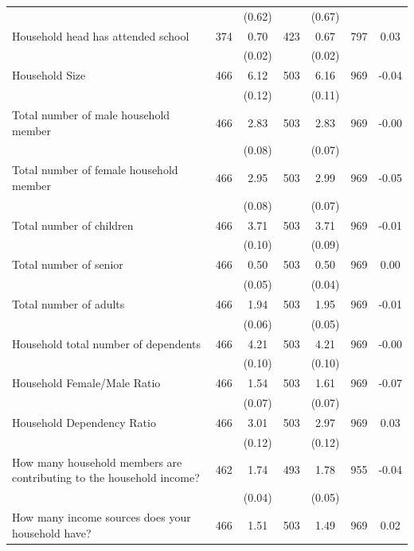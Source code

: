 \begin{tabular}{@{\extracolsep{5pt}}lcccccc}
 &   & (0.62)  &   & (0.67)  &   &  \\ [1ex]
Household head has attended school   & 374    & 0.70    & 423    & 0.67    & 797    & 0.03   \\
 &   & (0.02)  &   & (0.02)  &   &  \\ [1ex]
Household Size   & 466    & 6.12    & 503    & 6.16    & 969    & -0.04   \\
 &   & (0.12)  &   & (0.11)  &   &  \\ [1ex]
Total number of male household member   & 466    & 2.83    & 503    & 2.83    & 969    & -0.00   \\
 &   & (0.08)  &   & (0.07)  &   &  \\ [1ex]
Total number of female household member   & 466    & 2.95    & 503    & 2.99    & 969    & -0.05   \\
 &   & (0.08)  &   & (0.07)  &   &  \\ [1ex]
Total number of children   & 466    & 3.71    & 503    & 3.71    & 969    & -0.01   \\
 &   & (0.10)  &   & (0.09)  &   &  \\ [1ex]
Total number of senior   & 466    & 0.50    & 503    & 0.50    & 969    & 0.00   \\
 &   & (0.05)  &   & (0.04)  &   &  \\ [1ex]
Total number of adults   & 466    & 1.94    & 503    & 1.95    & 969    & -0.01   \\
 &   & (0.06)  &   & (0.05)  &   &  \\ [1ex]
Household total number of dependents   & 466    & 4.21    & 503    & 4.21    & 969    & -0.00   \\
 &   & (0.10)  &   & (0.10)  &   &  \\ [1ex]
Household Female/Male Ratio   & 466    & 1.54    & 503    & 1.61    & 969    & -0.07   \\
 &   & (0.07)  &   & (0.07)  &   &  \\ [1ex]
Household Dependency Ratio   & 466    & 3.01    & 503    & 2.97    & 969    & 0.03   \\
 &   & (0.12)  &   & (0.12)  &   &  \\ [1ex]
How many household members are contributing to the household income?   & 462    & 1.74    & 493    & 1.78    & 955    & -0.04   \\
 &   & (0.04)  &   & (0.05)  &   &  \\ [1ex]
How many income sources does your household have?   & 466    & 1.51    & 503    & 1.49    & 969    & 0.02   \\

\end{tabular}
